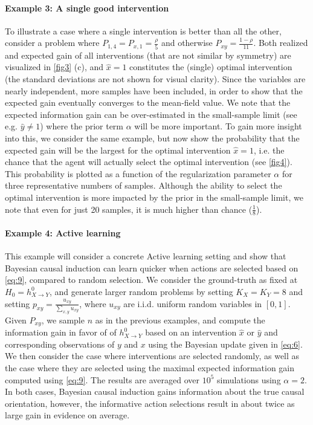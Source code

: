 \documentclass[letterpaper]{article} %
\begin{document}
\paragraph{Example 3: A single good intervention}
To illustrate a case where a single intervention is better than all the other, consider a problem where $P_{1,4} = P_{x,1} = \frac{\rho}{5}$ and otherwise $P_{xy} = \frac{1-\rho}{11}$. Both realized and expected gain of all interventions (that are not similar by symmetry) are visualized in \cref{fig3} (c), and $\hat x = 1$ constitutes the (single) optimal intervention (the standard deviations are not shown for visual clarity). %
Since the variables are nearly independent, more samples have been included, in order to show that the expected  gain eventually converges to the mean-field value.  We note that the expected information gain can be over-estimated in the small-sample limit (see e.g. $\hat y \neq 1$) where the prior term $\alpha$ will be more important.
To gain more insight into this, we consider the same example, but now show the probability that the expected gain will be the largest for the optimal intervention $\hat x=1$, i.e. the chance that the agent will actually select the optimal intervention (see  \cref{fig4}). This probability is plotted as a function of the regularization parameter $\alpha$ for three representative numbers of samples. Although the ability to select the optimal intervention is more impacted by the prior in the small-sample limit, we note that even for just 20 samples, it is much higher than chance ($\frac{1}{8}$).

\paragraph{Example 4: Active learning}
This example will consider a concrete Active learning setting and show that Bayesian causal induction can learn quicker when actions are selected based on \cref{eq:9}, compared to random selection. We consider the ground-truth as fixed at $H_0 = h^0_{X \rightarrow Y}$, and generate larger random problems by setting $K_X = K_Y  =8$ and setting $p_{xy} = \frac{u_{xy}}{\sum_{x,y} u_{xy}}$, where $u_{xy}$ are i.i.d. uniform random variables in $[0,1]$. Given $P_{xy}$, we sample $n$ as in the previous examples, and compute the information gain in favor of of $h^0_{X\rightarrow Y}$ based on an intervention $\hat x$ or $\hat y$ and corresponding observations of $y$ and $x$ using the Bayesian update given in \cref{eq:6}. We then consider the case where interventions are selected randomly,
as well as the case where
they are selected using the maximal expected information gain computed using \cref{eq:9}. The results are averaged over $10^5$ simulations using $\alpha=2$. In both cases, Bayesian causal induction gains information about the true causal orientation, however, the informative action selections result in about twice as large gain in evidence on average.
\end{document}
